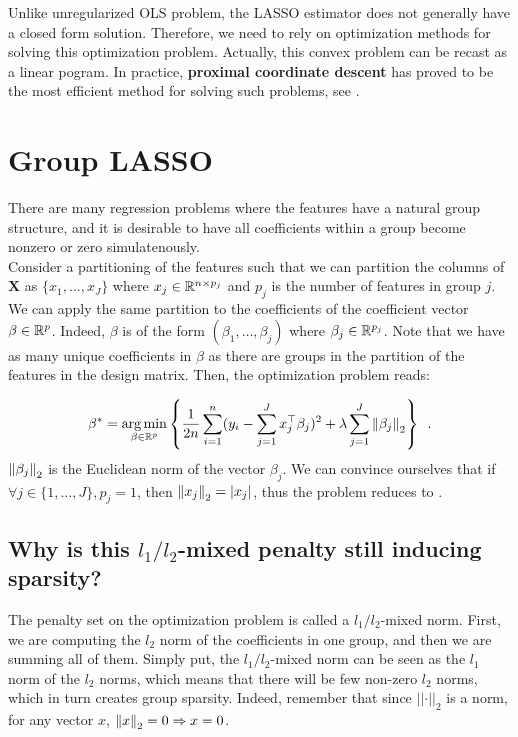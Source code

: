 \documentclass[a4paper,10pt]{article}
\theoremstyle{definition}
\begin{document}
Unlike unregularized OLS problem, the LASSO estimator does not generally have a closed form solution. Therefore, we need to rely on optimization methods for solving this optimization problem. Actually, this convex problem
can be recast as a linear pogram. In practice, \textbf{proximal coordinate descent} has proved to be the most efficient method for solving such problems, see \cite{Bertrand_Massias_Anderson}.

\section{Group LASSO}
\label{section_2}

There are many regression problems where the features have a natural group structure, and it is desirable to have all coefficients within a group become nonzero or zero simulatenously.
\\
Consider a partitioning of the features such that we can partition the columns of $\mathbf{X}$ as $\{x_{1}, \dots, x_{J}\}$ where $x_{j} \in \mathbb{R}^{n \times p_j}$ and
$p_j$ is the number of features in group $j$. We can apply the same partition to the coefficients of the coefficient vector $\beta \in \mathbb{R}^p$. Indeed, $\beta$ is of the form $(\beta_{1}, \dots, \beta_{j})$ where
$\beta_{j} \in \mathbb{R}^{p_j}$. Note that we have as many unique coefficients in $\beta$ as there are groups in the partition of the features in the design matrix. Then, the optimization problem reads:

\begin{equation*}
    \beta^* = \operatorname*{arg\,min}_{\beta \in \mathbb{R}^p}
        \left\{
            \frac{1}{2n} \sum_{i=1}^n (y_i - \sum_{j=1}^J x_{j}^\top \beta_{j})^2
            + \lambda \sum_{j=1}^{J} \left \lVert  \beta_{j} \right \rVert_2
        \right\}
    \enspace .
\end{equation*}
%
$ \left \lVert \beta_{j} \right \rVert_2$ is the Euclidean norm of the vector $\beta_{j}$. We can convince ourselves that if $\forall j \in \{1, \dots, J\}, p_j = 1$, then $\left \lVert  x_{j} \right \rVert_2 = \lvert x_{j} \rvert$,
thus the problem reduces to .

\subsection*{Why is this $l_1 / l_2$-mixed penalty still inducing sparsity?}

The penalty set on the optimization problem is called a $l_1/l_2$-mixed norm. First, we are computing the $l_2$ norm of the coefficients in one group, and then we are summing all of them.
Simply put, the $l_1/l_2$-mixed norm can be seen as the $l_1$ norm of the $l_2$ norms, which means that there will be few non-zero $l_2$ norms, which in turn creates group sparsity.
Indeed, remember that since $\lvert \lvert \cdot \rvert \rvert_2$ is a norm, for any vector $x$, $\left \lVert  x \right \rVert_2 = 0 \Rightarrow x = 0$.
\end{document}
